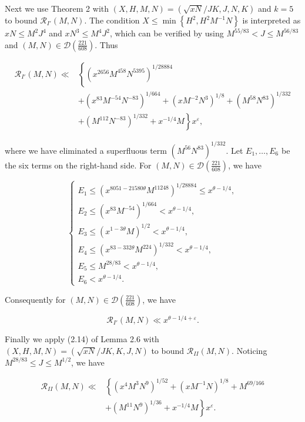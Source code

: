 \documentclass[10pt]{article}
\begin{document}
Next we use Theorem 2 with $(X, H, M, N)=(\sqrt{x N} / J K, J, N, K)$ and $k=5$ to bound $\mathscr R_{I'}(M, N)$. The condition $X \leqslant \min \left\{H^{2}, H^{2} M^{-1} N\right\}$ is interpreted as $x N \leqslant M^{2} J^{4}$ and $x N^{3} \leqslant M^{4} J^{2}$, which can be verified by using $M^{55 / 83}<J \leqslant M^{56 / 83}$ and $(M, N) \in \mathscr{D}\left(\frac{221}{608}\right)$. Thus

$$
\begin{aligned}
\mathscr R_{I'}(M, N) \ll & \left\{\left(x^{2656} M^{458} N^{5395}\right)^{1 / 28884}\right. \\
& +\left(x^{83} M^{-54} N^{-83}\right)^{1 / 664}+\left(x M^{-2} N^{3}\right)^{1 / 8}+\left(M^{58} N^{83}\right)^{1 / 332} \\
& \left.+\left(M^{112} N^{-83}\right)^{1 / 332}+x^{-1 / 4} M\right\} x^{\varepsilon},
\end{aligned}
$$

where we have eliminated a superfluous term $\left(M^{56} N^{83}\right)^{1 / 332}$. Let $E_{1}, \ldots, E_{6}$ be the six terms on the right-hand side. For $(M, N) \in \mathscr{D}\left(\frac{221}{608}\right)$, we have

$$
\left\{\begin{array}{l}
E_{1} \leqslant\left(x^{8051-21580 \theta} M^{11248}\right)^{1 / 28884} \leqslant x^{\theta-1 / 4}, \\
E_{2} \leqslant\left(x^{83} M^{-54}\right)^{1 / 664}<x^{\theta-1 / 4}, \\
E_{3} \leqslant\left(x^{1-3 \theta} M\right)^{1 / 2}<x^{\theta-1 / 4}, \\
E_{4} \leqslant\left(x^{83-332 \theta} M^{224}\right)^{1 / 332}<x^{\theta-1 / 4}, \\
E_{5} \leqslant M^{28 / 83}<x^{\theta-1 / 4}, \\
E_{6}<x^{\theta-1 / 4} .
\end{array}\right.
$$

Consequently for $(M, N) \in \mathscr{D}\left(\frac{221}{608}\right)$, we have


\begin{equation*}
\mathscr R_{I'}(M, N) \ll x^{\theta-1 / 4+\varepsilon} . \tag{4.3}
\end{equation*}


Finally we apply (2.14) of Lemma 2.6 with $(X, H, M, N)=(\sqrt{x N} / J K, K, J, N)$ to bound $\mathscr R_{II}(M, N)$. Noticing $M^{28 / 83} \leqslant J \leqslant M^{1 / 2}$, we have

$$
\begin{aligned}
\mathscr R_{II}(M, N) \ll & \left\{\left(x^{4} M^{3} N^{9}\right)^{1 / 52}+\left(x M^{-1} N\right)^{1 / 8}+M^{69 / 166}\right. \\
& \left.+\left(M^{11} N^{9}\right)^{1 / 36}+x^{-1 / 4} M\right\} x^{\varepsilon} .
\end{aligned}
$$
\end{document}
